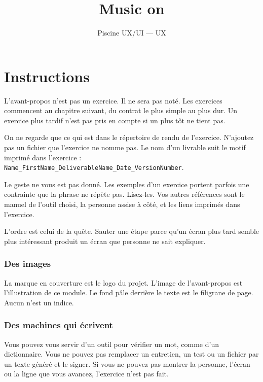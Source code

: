 \documentclass{training}
\begin{document}
\title{Music on}
\subtitle{Piscine UX/UI --- UX}
\maketitle

\newpage
\tableofcontents
\newpage


\chapter{Instructions}

L'avant-propos n'est pas un exercice. Il ne sera pas noté. Les exercices commencent au chapitre suivant, du contrat le plus simple au plus dur. Un exercice plus tardif n'est pas pris en compte si un plus tôt ne tient pas.

On ne regarde que ce qui est dans le répertoire de rendu de l'exercice. N'ajoutez pas un fichier que l'exercice ne nomme pas. Le nom d'un livrable suit le motif imprimé dans l'exercice : \texttt{Name\_FirstName\_DeliverableName\_Date\_VersionNumber}.

Le geste ne vous est pas donné. Les exemples d'un exercice portent parfois une contrainte que la phrase ne répète pas. Lisez-les. Vos autres références sont le manuel de l'outil choisi, la personne assise à côté, et les liens imprimés dans l'exercice.

L'ordre est celui de la quête. Sauter une étape parce qu'un écran plus tard semble plus intéressant produit un écran que personne ne sait expliquer.

\subsection*{Des images}

La marque en couverture est le logo du projet. L'image de l'avant-propos est l'illustration de ce module. Le fond pâle derrière le texte est le filigrane de page. Aucun n'est un indice.

\subsection*{Des machines qui écrivent}

Vous pouvez vous servir d'un outil pour vérifier un mot, comme d'un dictionnaire. Vous ne pouvez pas remplacer un entretien, un test ou un fichier par un texte généré et le signer. Si vous ne pouvez pas montrer la personne, l'écran ou la ligne que vous avancez, l'exercice n'est pas fait.
\end{document}
